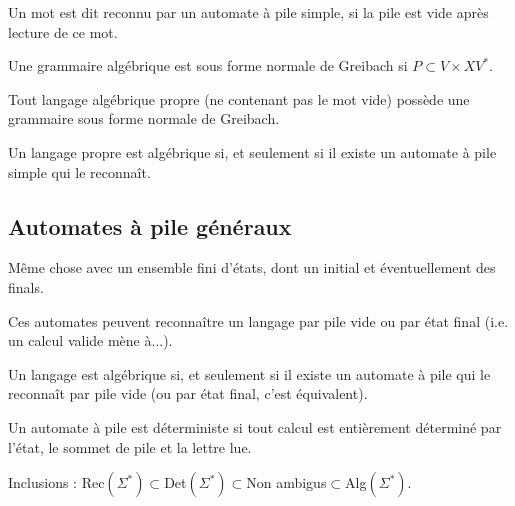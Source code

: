 \documentclass[a4paper]{article}
\begin{document}
\begin{defi}
Un mot est dit reconnu par un automate à pile simple, si la pile est vide après lecture de ce mot.
\end{defi}

\begin{defi}
Une grammaire algébrique est sous forme normale de Greibach si $P\subset V\times XV^*$.
\end{defi}

\begin{prop}
Tout langage algébrique propre (ne contenant pas le mot vide) possède une grammaire sous forme normale de Greibach.
\end{prop}

\begin{prop}
Un langage propre est algébrique si, et seulement si il existe un automate à pile simple qui le reconnaît.
\end{prop}

\subsection{Automates à pile généraux}

\begin{defi}
Même chose avec un ensemble fini d'états, dont un initial et éventuellement des finals.
\end{defi}

\begin{defi}
Ces automates peuvent reconnaître un langage par pile vide ou par état final (i.e. un calcul valide mène à...).
\end{defi}

\begin{prop}
Un langage est algébrique si, et seulement si il existe un automate à pile qui le reconnaît par pile vide (ou par état final, c'est équivalent).
\end{prop}

\begin{defi}
Un automate à pile est déterministe si tout calcul est entièrement déterminé par l'état, le sommet de pile et la lettre lue.
\end{defi}

\begin{prop}
Inclusions : Rec$(\Sigma^*)\subset$Det$(\Sigma^*)\subset$Non ambigus$\subset$Alg$(\Sigma^*)$.
\end{prop}
\end{document}
